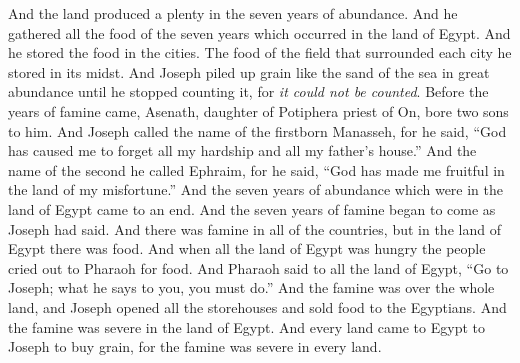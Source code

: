 \begin{biblechapter}
\verse And the land produced a plenty in the seven years of abundance.
\verse And he gathered all the food of the seven years which occurred in the land of Egypt. And he stored the food in the cities. The food of the field that surrounded each city he stored in its midst.
\verse And Joseph piled up grain like the sand of the sea in great abundance until he stopped counting it, for \textit{it could not be counted}.
\verse Before the years of famine came, Asenath, daughter of Potiphera priest of On, bore two sons to him.
\verse And Joseph called the name of the firstborn Manasseh, for he said, “God has caused me to forget all my hardship and all my father’s house.”
\verse And the name of the second he called Ephraim, for he said, “God has made me fruitful in the land of my misfortune.”
\verse And the seven years of abundance which were in the land of Egypt came to an end.
\verse And the seven years of famine began to come as Joseph had said. And there was famine in all of the countries, but in the land of Egypt there was food.
\verse And when all the land of Egypt was hungry the people cried out to Pharaoh for food. And Pharaoh said to all the land of Egypt, “Go to Joseph; what he says to you, you must do.”
\verse And the famine was over the whole land, and Joseph opened all the storehouses and sold food to the Egyptians. And the famine was severe in the land of Egypt.
\verse And every land came to Egypt to Joseph to buy grain, for the famine was severe in every land.
\end{biblechapter}

